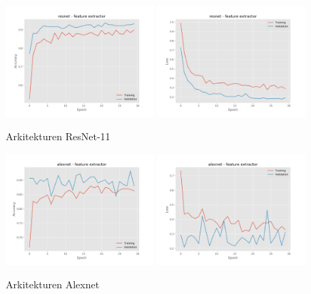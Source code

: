 \documentclass{kththesis}
\begin{document}
    \begin{figure}
      \centering
      \includegraphics[width=0.49\textwidth]{"./room/room-classification - acc - resnet - feature extractor"}
      \includegraphics[width=0.49\textwidth]{"./room/room-classification - loss - resnet - feature extractor"}
      \caption{Arkitekturen ResNet-11}
    \end{figure}
    \begin{figure}
      \centering
      \includegraphics[width=0.49\textwidth]{"./room/room-classification - acc - alexnet - feature extractor"}
      \includegraphics[width=0.49\textwidth]{"./room/room-classification - loss - alexnet - feature extractor"}
      \caption{Arkitekturen Alexnet}
    \end{figure}
\end{document}
